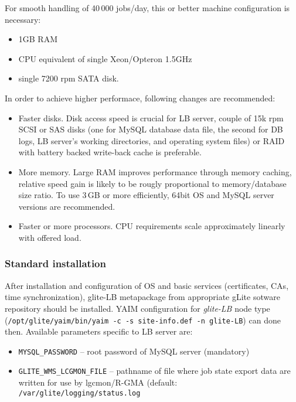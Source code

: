 For smooth handling of 40\,000 jobs/day, this or better machine configuration 
is necessary:
\begin{itemize}
\item 1GB RAM
\item CPU equivalent of single Xeon/Opteron 1.5GHz
\item single 7200 rpm SATA disk.
\end{itemize}
In order to achieve higher performace, following changes are recommended:
\begin{itemize}
\item Faster disks. Disk access speed is crucial for LB server, couple of 15k rpm
SCSI or SAS disks (one for MySQL database data file, the second for DB logs, LB server's
working directories, and operating system files) or RAID with battery backed 
write-back cache is preferable.
\item More memory. Large RAM improves performance through memory caching,
relative speed gain is likely to be rougly proportional to memory/database size ratio.
To use 3\,GB or more efficiently, 64bit OS and MySQL server versions are recommended.
\item Faster or more processors. CPU requirements scale approximately linearly with
offered load.
\end{itemize}

\subsubsection{Standard installation}

After installation and configuration of OS and basic services
(certificates, CAs, time synchronization), glite-LB metapackage 
from appropriate gLite sotware repository should be installed.
YAIM configuration for \emph{glite-LB} node type 
(\texttt{/opt/glite/yaim/bin/yaim -c -s site-info.def -n glite-LB}) 
can done then. Available parameters specific to LB server are:

\begin{itemize}
\item \texttt{MYSQL\_PASSWORD} -- root password of MySQL server (mandatory)
\item \texttt{GLITE\_WMS\_LCGMON\_FILE} -- pathname of file where job state
export data are written for use by lgcmon/R-GMA 
(default: \texttt{/var/glite/logging/status.log}
\end{itemize}

